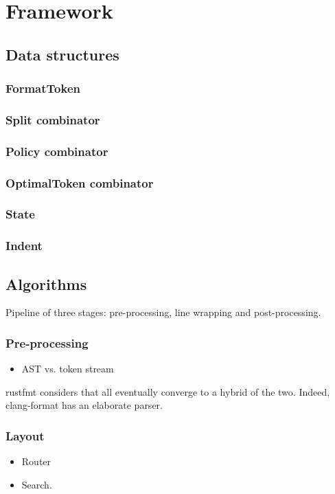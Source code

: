 \documentclass[11pt,a4paper]{article}
\begin{document}
\section{Framework}
\subsection{Data structures}
\subsubsection{FormatToken}
\subsubsection{Split combinator}
\subsubsection{Policy combinator}
\subsubsection{OptimalToken combinator}
\subsubsection{State}
\subsubsection{Indent}
\subsection{Algorithms}
Pipeline of three stages: pre-processing, line wrapping and post-processing.
\subsubsection{Pre-processing}
 \begin{itemize}
   \item AST vs. token stream
 \end{itemize}
rustfmt considers that all eventually converge to a hybrid of the two.
Indeed, clang-format has an elaborate parser.
\subsubsection{Layout}
\begin{itemize}
  \item Router
  \item Search.
\end{itemize}
\end{document}
